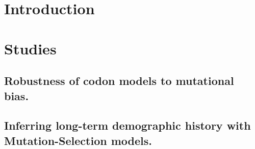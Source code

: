 \documentclass[a4paper,oneside,nobind]{thesis}
\begin{document}
%
\hypersetup{pageanchor=true}
\begin{romanpages}
\dominitoc %
\flushbottom
{
	\setlength{\baselineskip}{\frontmatterbaselineskip}
	\hypersetup{linkcolor=GREYDARK}
	\tableofcontents
	\listoffigures
	\mtcaddchapter
	\listoftables
	\mtcaddchapter
}
{
	\setlength{\baselineskip}{\frontmatterbaselineskip}
	
}

\end{romanpages}

\flushbottom


\pagestyle{fancybook}

\part{Introduction}
\setlength{\baselineskip}{1.5\frontmatterbaselineskip}

\label{part:intro}





\part{Studies}
\label{part:studies}

\chapter[Robustness of codon models to mutational bias]{Robustness of codon models to mutational bias.}
{\hypersetup{linkcolor=GREYDARK}\minitoc}
\label{chap:NucleotideBias}


\chapter[Inferring long-term population size] {Inferring long-term demographic history with Mutation-Selection models.}
{\hypersetup{linkcolor=GREYDARK}\minitoc}
\label{chap:MutSelDrift}

\end{document}
